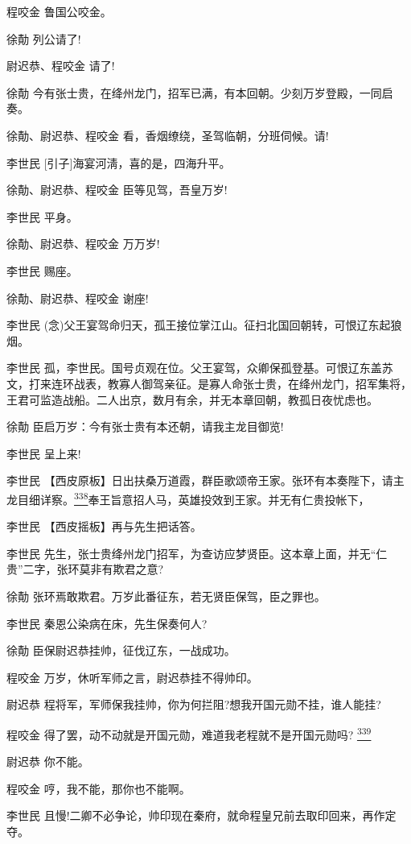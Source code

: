 程咬金 鲁国公咬金。

徐勣 列公请了!

尉迟恭、程咬金 请了!

徐勣
今有张士贵，在绛州龙门，招军已满，有本回朝。少刻万岁登殿，一同启奏。

徐勣、尉迟恭、程咬金 看，香烟缭绕，圣驾临朝，分班伺候。请!

李世民 {[}引子{]}海宴河淸，喜的是，四海升平。

徐勣、尉迟恭、程咬金 臣等见驾，吾皇万岁!

李世民 平身。

徐勣、尉迟恭、程咬金 万万岁!

李世民 赐座。

徐勣、尉迟恭、程咬金 谢座!

李世民
(念)父王宴驾命归天，孤王接位掌江山。征扫北国回朝转，可恨辽东起狼烟。

李世民
孤，李世民。国号贞观在位。父王宴驾，众卿保孤登基。可恨辽东盖苏文，打来连环战表，教寡人御驾亲征。是寡人命张士贵，在绛州龙门，招军集将，王君可监造战船。二人出京，数月有余，并无本章回朝，教孤日夜忧虑也。

徐勣 臣启万岁：今有张士贵有本还朝，请我主龙目御览!

李世民 呈上来!

李世民
【西皮原板】日出扶桑万道霞，群臣歌颂帝王家。张环有本奏陛下，请主龙目细详察。\protect\hyperlink{fn338}{\textsuperscript{338}}奉王旨意招人马，英雄投效到王家。并无有仁贵投帐下，

李世民 【西皮摇板】再与先生把话答。

李世民
先生，张士贵绛州龙门招军，为查访应梦贤臣。这本章上面，并无``仁贵''二字，张环莫非有欺君之意?

徐勣 张环焉敢欺君。万岁此番征东，若无贤臣保驾，臣之罪也。

李世民 秦恩公染病在床，先生保奏何人?

徐勣 臣保尉迟恭挂帅，征伐辽东，一战成功。

程咬金 万岁，休听军师之言，尉迟恭挂不得帅印。

尉迟恭 程将军，军师保我挂帅，你为何拦阻?想我开国元勋不挂，谁人能挂?

程咬金 得了罢，动不动就是开国元勋，难道我老程就不是开国元勋吗?
\protect\hyperlink{fn339}{\textsuperscript{339}}

尉迟恭 你不能。

程咬金 哼，我不能，那你也不能啊。

李世民
且慢!二卿不必争论，帅印现在秦府，就命程皇兄前去取印回来，再作定夺。

